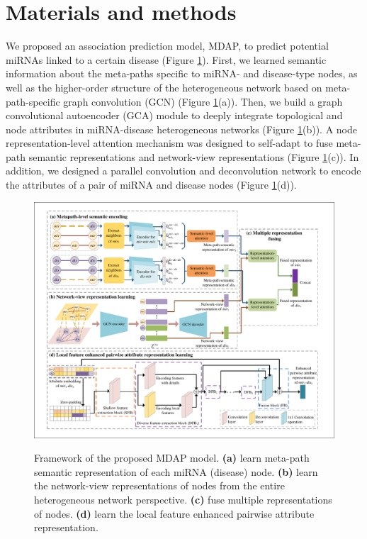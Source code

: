 \documentclass[journal,twoside,web]{ieeecolor}
\begin{document}
\section{Materials and methods}
We proposed an association prediction model, MDAP, to predict potential miRNAs linked to a certain disease (Figure \ref{fig:01}). First, we learned semantic information about the meta-paths specific to miRNA- and disease-type nodes, as well as the higher-order structure of the heterogeneous network based on meta-path-specific graph convolution (GCN) (Figure \ref{fig:01}(a)). Then, we build a graph convolutional autoencoder (GCA) module to deeply integrate topological and node attributes in miRNA-disease heterogeneous networks (Figure \ref{fig:01}(b)). A node representation-level attention mechanism was designed to self-adapt to fuse meta-path semantic representations and network-view representations (Figure \ref{fig:01}(c)). In addition, we designed a parallel convolution and deconvolution network to encode the attributes of a pair of miRNA and disease nodes (Figure \ref{fig:01}(d)). 

\begin{figure}
	\centering
	\includegraphics[width=6.9in]{fig/fig1.pdf}\\
	\caption{Framework of the proposed MDAP model. {\textbf{(a)} learn meta-path semantic representation of each miRNA (disease) node. \textbf{(b)} learn the network-view representations of nodes from the entire heterogeneous network perspective. \textbf{(c)} fuse multiple representations of nodes. \textbf{(d)} learn the local feature enhanced pairwise attribute representation.}}
    \label{fig:01}
	\vspace{-0.4cm}
\end{figure}
\end{document}
